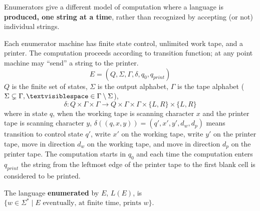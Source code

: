 \documentclass[12pt, oneside]{article}
\begin{document}
\newpage
{} Enumerators give a different
model of computation where a language is {\bf produced, one string at a time},
rather than recognized by accepting (or not) individual strings.

Each enumerator machine has finite state control, unlimited work tape, and a printer. The computation proceeds
according to transition function; at any point machine may ``send'' a string to the printer.
\[
E  = (Q, \Sigma, \Gamma, \delta, q_0, q_{print})  
\]
$Q$ is the finite set of states, $\Sigma$ is  the output alphabet, $\Gamma$ is the 
tape alphabet ($\Sigma  \subsetneq\Gamma, 
\textvisiblespace \in \Gamma \setminus \Sigma$), 
\[
\delta:  Q  \times  \Gamma \times \Gamma \to  Q \times  \Gamma \times  \Gamma \times \{L, R\} \times  \{L, R\}
\]
where in state $q$, when the working tape is scanning character $x$ and the printer tape is scanning character $y$,
$\delta( (q,x,y) ) = (q', x', y', d_w, d_p)$ means transition to control state $q'$, write $x'$ on 
the working tape, write $y'$ on the printer tape, move in direction $d_w$ on the working tape, and move in direction 
$d_p$ on the printer tape. The computation starts in $q_0$ and each time the computation enters $q_{print}$
the string from the leftmost edge of the printer tape to the first blank cell is considered to be printed.

The language  {\bf  enumerated} by  $E$, $L(E)$, is $\{ w \in \Sigma^* \mid \text{$E$ eventually, at finite  time, 
prints $w$} \}$.
\end{document}
